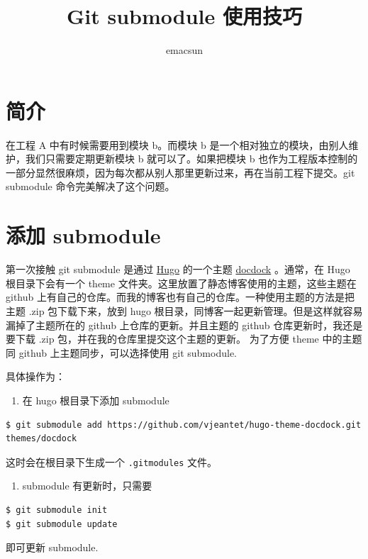 \documentclass[10pt,a4paper,UTF8]{article}
\author{emacsun}
\date{}
\title{Git submodule 使用技巧}
\begin{document}
\maketitle
\tableofcontents
{}

\section{简介}
\label{sec:orga7ab815}

在工程 A 中有时候需要用到模块 b。而模块 b 是一个相对独立的模块，由别人维护，我们只需要定期更新模块 b 就可以了。如果把模块 b 也作为工程版本控制的一部分显然很麻烦，因为每次都从别人那里更新过来，再在当前工程下提交。git submodule 命令完美解决了这个问题。
\section{添加 submodule}
\label{sec:orgcbdfa3f}


第一次接触 git submodule 是通过 \href{http://gohugo.io/}{Hugo} 的一个主题 \href{https://themes.gohugo.io/docdock/}{docdock} 。通常，在 Hugo 根目录下会有一个 theme 文件夹。这里放置了静态博客使用的主题，这些主题在 github 上有自己的仓库。而我的博客也有自己的仓库。一种使用主题的方法是把主题 .zip 包下载下来，放到 hugo 根目录，同博客一起更新管理。但是这样就容易漏掉了主题所在的 github 上仓库的更新。并且主题的 github 仓库更新时，我还是要下载 .zip 包，并在我的仓库里提交这个主题的更新。 为了方便 theme 中的主题同 github 上主题同步，可以选择使用 git submodule.

具体操作为：
\begin{enumerate}
\item 在 hugo 根目录下添加 submodule
\end{enumerate}
\begin{verbatim}
$ git submodule add https://github.com/vjeantet/hugo-theme-docdock.git themes/docdock
\end{verbatim}
这时会在根目录下生成一个 \texttt{.gitmodules} 文件。
\begin{enumerate}
\item submodule 有更新时，只需要
\end{enumerate}
\begin{verbatim}
$ git submodule init
$ git submodule update
\end{verbatim}
即可更新 submodule.
\end{document}
